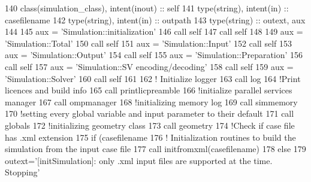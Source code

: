 \begin{DoxyCode}
140     \textcolor{keywordtype}{class}(simulation\_class), \textcolor{keywordtype}{intent(inout)} :: self
141     \textcolor{keywordtype}{type}(string), \textcolor{keywordtype}{intent(in)} :: casefilename
142     \textcolor{keywordtype}{type}(string), \textcolor{keywordtype}{intent(in)} :: outpath
143     \textcolor{keywordtype}{type}(string) :: outext, aux
144 
145     aux = \textcolor{stringliteral}{'Simulation::initialization'}
146     \textcolor{keyword}{call }self%
147     \textcolor{keyword}{call }self%
148 
149     aux = \textcolor{stringliteral}{'Simulation::Total'}
150     \textcolor{keyword}{call }self%
151     aux = \textcolor{stringliteral}{'Simulation::Input'}
152     \textcolor{keyword}{call }self%
153     aux = \textcolor{stringliteral}{'Simulation::Output'}
154     \textcolor{keyword}{call }self%
155     aux = \textcolor{stringliteral}{'Simulation::Preparation'}
156     \textcolor{keyword}{call }self%
157     aux = \textcolor{stringliteral}{'Simulation::SV encoding/decoding'}
158     \textcolor{keyword}{call }self%
159     aux = \textcolor{stringliteral}{'Simulation::Solver'}
160     \textcolor{keyword}{call }self%
161 
162     \textcolor{comment}{! Initialize logger}
163     \textcolor{keyword}{call }log%
164     \textcolor{comment}{!Print licences and build info}
165     \textcolor{keyword}{call }printlicpreamble
166     \textcolor{comment}{!initialize parallel services manager}
167     \textcolor{keyword}{call }ompmanager%
168     \textcolor{comment}{!initializing memory log}
169     \textcolor{keyword}{call }simmemory%
170     \textcolor{comment}{!setting every global variable and input parameter to their default}
171     \textcolor{keyword}{call }globals%
172     \textcolor{comment}{!initializing geometry class}
173     \textcolor{keyword}{call }geometry%
174     \textcolor{comment}{!Check if case file has .xml extension}
175     \textcolor{keywordflow}{if} (casefilename%
176         \textcolor{comment}{! Initialization routines to build the simulation from the input case file}
177         \textcolor{keyword}{call }initfromxml(casefilename)
178     \textcolor{keywordflow}{else}
179         outext=\textcolor{stringliteral}{'[initSimulation]: only .xml input files are supported at the time. Stopping'}

\end{DoxyCode}
